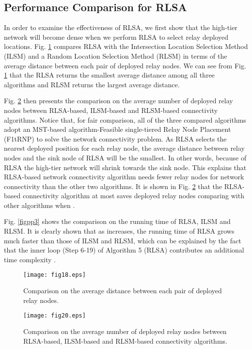 \documentclass[journal]{IEEEtran}
\begin{document}
\subsection{Performance Comparison for RLSA}
In order to examine the effectiveness of RLSA, we first show that the high-tier network will become dense when we perform RLSA to select relay deployed locations. Fig. \ref{fig18} compares RLSA with the Intersection Location Selection Method (ILSM) \cite{Tang06} \cite{Ali11} and a Random Location Selection Method (RLSM) in terms of the average distance between each pair of deployed relay nodes. We can see from Fig. \ref{fig18} that the RLSA returns the smallest average distance among all three algorithms and RLSM returns the largest average distance.

Fig. \ref{fig20} then presents the comparison on the average number of deployed relay nodes between RLSA-based, ILSM-based and RLSM-based connectivity algorithms. Notice that, for fair comparison, all of the three compared algorithms adopt an MST-based algorithm-Feasible single-tiered Relay Node Placement (F1tRNP) \cite{Lloyd07} to solve the network connectivity problem. As RLSA selects the nearest deployed position for each relay node, the average distance between relay nodes and the sink node of RLSA will be the smallest. In other words, because of RLSA the high-tier network will shrink towards the sink node. This explains that RLSA-based network connectivity algorithm needs fewer relay nodes for network connectivity than the other two algorithms. It is shown in Fig. \ref{fig20} that the RLSA-based connectivity algorithm at most saves  deployed relay nodes comparing with other algorithms when .

Fig. \ref{figpp3} shows the comparison on the running time of RLSA, ILSM and RLSM. It is clearly shown that as  increases, the running time of RLSA grows much faster than those of ILSM and RLSM, which can be explained by the fact that the inner loop (Step 6-19) of Algorithm 5 (RLSA) contributes an additional time complexity .
\begin{figure}
\begin{center}
\texttt{[image: fig18.eps]}    \caption{Comparison on the average distance between each pair of deployed relay nodes.}
\label{fig18}                                 \end{center}                                 \end{figure}



\begin{figure}
\begin{center}
\texttt{[image: fig20.eps]}    \caption{Comparison on the average number of deployed relay nodes between RLSA-based, ILSM-based and RLSM-based connectivity algorithms.}
\label{fig20}                                 \end{center}                                 \end{figure}
\end{document}
